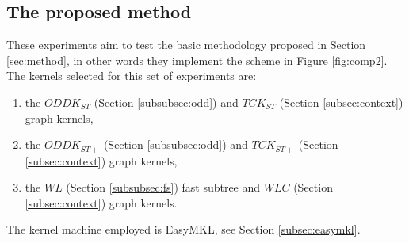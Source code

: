 %

\subsection{The proposed method}
\label{subsec:firstg}

These experiments aim to test the basic methodology proposed in Section \ref{sec:method},
in other words they implement the scheme in Figure \ref{fig:comp2}.
The kernels selected for this set of experiments are:
\begin{enumerate}
    \item the $ODDK_{ST}$ (Section \ref{subsubsec:odd}) and $TCK_{ST}$ (Section \ref{subsec:context}) graph kernels,
    \item the $ODDK_{ST+}$ (Section \ref{subsubsec:odd}) and $TCK_{ST+}$ (Section \ref{subsec:context}) graph kernels,
    \item the $WL$ (Section \ref{subsubsec:fs}) fast subtree and $WLC$ (Section \ref{subsec:context}) graph kernels.
\end{enumerate}
The kernel machine employed is EasyMKL, see Section \ref{subsec:easymkl}.

